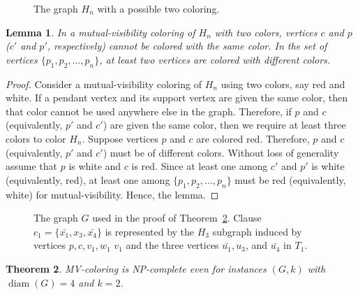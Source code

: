 \documentclass[12pt]{article}
\newtheorem{theorem}{Theorem}[section]
\newtheorem{lemma}[theorem]{Lemma}
\newcommand{\diam}{\mathop{\mathrm{diam}}}
\begin{document}
\begin{figure}
    \centering
    
    \caption{The graph $H_n$ with a possible two coloring.}
    \label{fig:Hn}
\end{figure}

\begin{lemma}\label{lem:Hn}
    In a mutual-visibility coloring of $H_n$ with two colors, vertices $c$ and $p$ ($c'$ and $p'$, respectively) cannot be colored with the same color. In the set of vertices $\{p_1, p_2,\ldots,p_n\}$, at least two vertices are colored with different colors.
\end{lemma}
\begin{proof}
Consider a mutual-visibility coloring of $H_n$ using two colors, say red and white. If a pendant vertex and its support vertex are given the same color, then that color cannot be used anywhere else in the graph. Therefore, if $p$ and $c$ (equivalently, $p'$ and $c'$) are given the same color, then we require at least three colors to color $H_n$.  Suppose vertices $p$ and $c$ are colored red. Therefore, $p$ and $c$ (equivalently, $p'$ and $c'$) must be of different colors. Without loss of generality assume that $p$ is white and $c$ is red. Since at least one among $c'$ and $p'$ is white (equivalently, red), at least one among $\{p_1, p_2, ..., p_n\}$ must be red (equivalently, white) for mutual-visibility. Hence, the lemma. 
\end{proof}

\begin{figure}\label{fig:NP}
    \centering
    \scalebox{0.8} {}
    \caption{The graph $G$ used in the proof of Theorem~\ref{thm:mvc-NP}. Clause $c_1=\{\bar{x_1},x_3,\bar{x_4}\}$ is represented by the $H_3$ subgraph induced by vertices $p,c,v_1,w_1$ $v_1$ and the three vertices $\bar{u_1},u_3$, and $\bar{u_4}$ in $T_1$.}
    \label{fig:G}
\end{figure}
\begin{theorem}\label{thm:mvc-NP}
 {\sc MV-coloring} is NP-complete even for instances $(G,k)$ with $\diam(G) = 4$ and $k=2$.  
\end{theorem}  
\end{document}
